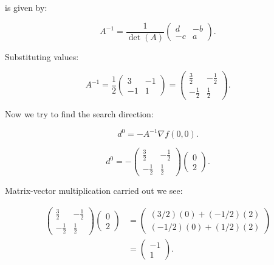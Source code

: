 \documentclass{article}
\begin{document}
is given by:

\begin{equation}
A^{-1} = \frac{1}{\det(A)}
\begin{pmatrix} d & -b \\ -c & a \end{pmatrix}.
\end{equation}

Substituting values:

\begin{equation}
A^{-1} = \frac{1}{2}
\begin{pmatrix}
3 & -1 \\
-1 & 1
\end{pmatrix}
=
\begin{pmatrix}
\frac{3}{2} & -\frac{1}{2} \\
-\frac{1}{2} & \frac{1}{2}
\end{pmatrix}.
\end{equation}

Now we try to find the search direction: 

\begin{equation}
d^0 = - A^{-1} \nabla f(0,0).
\end{equation}

\begin{equation}
d^0 = - 
\begin{pmatrix} \frac{3}{2} & -\frac{1}{2} \\ -\frac{1}{2} & \frac{1}{2} \end{pmatrix}
\begin{pmatrix} 0 \\ 2 \end{pmatrix}.
\end{equation}

Matrix-vector multiplication carried out we see:

\begin{align*}
\begin{pmatrix} \frac{3}{2} & -\frac{1}{2} \\ -\frac{1}{2} & \frac{1}{2} \end{pmatrix}
\begin{pmatrix} 0 \\ 2 \end{pmatrix}
&=
\begin{pmatrix} (3/2)(0) + (-1/2)(2) \\ (-1/2)(0) + (1/2)(2) \end{pmatrix} \\
&=
\begin{pmatrix} -1 \\ 1 \end{pmatrix}.
\end{align*}
\end{document}
